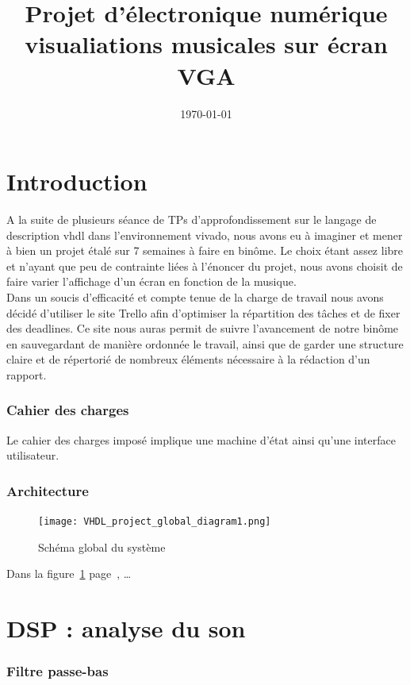 \documentclass[hidelinks]{article}
\title{%
	Projet d'électronique numérique \\
	\large{visualiations musicales sur écran VGA}}
\date\today
\author{
	\bsc{LESTANDI Nathan}
	\and
	\bsc{ECOCHARD Florent}
}
\begin{document}
    \maketitle
    \newpage
    \tableofcontents
    \newpage
    \part*{Introduction}
	A la suite de plusieurs séance de TPs d'approfondissement sur le langage de description vhdl dans l'environnement vivado, nous avons eu à imaginer et mener à bien un projet étalé sur 7 semaines à faire en binôme. Le choix étant assez libre et n'ayant que peu de contrainte liées à l'énoncer du projet, nous avons choisit de faire varier l'affichage d'un écran en fonction de la musique.\\
	Dans un soucis d'efficacité et compte tenue de la charge de travail nous avons décidé d'utiliser le site Trello afin d'optimiser la répartition des tâches et de fixer des deadlines. Ce site nous auras permit de suivre l'avancement de notre binôme en sauvegardant de manière ordonnée le travail, ainsi que de garder une structure claire et de répertorié de nombreux éléments nécessaire à la rédaction d'un rapport.
    \section{Cahier des charges}
    Le cahier des charges imposé implique une machine d'état ainsi qu'une interface utilisateur. 
    
    
    \section{Architecture}
    \begin{figure}[h]
    \texttt{[image: VHDL\_project\_global\_diagram1.png]}
    \caption{\label{global} Schéma global du système}
    \end{figure}
    Dans la figure~\ref{global} page~\pageref{global}, …
    \newpage
    \part{DSP : analyse du son}
    \section{Filtre passe-bas}
\end{document}
